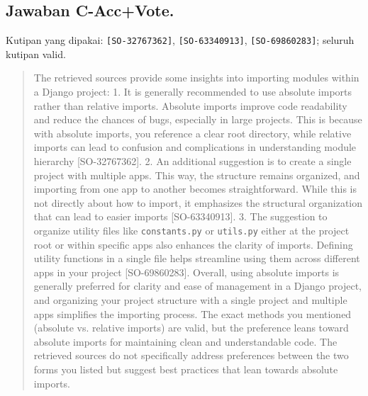 \subsection{Jawaban C-Acc+Vote.} Kutipan yang dipakai: \texttt{[SO-32767362]}, \texttt{[SO-63340913]}, \texttt{[SO-69860283]}; seluruh kutipan valid.
\begin{quote}\small The retrieved sources provide some insights into importing modules within a Django project:  1. It is generally recommended to use absolute imports rather than relative imports. Absolute imports improve code readability and reduce the chances of bugs, especially in large projects. This is because with absolute imports, you reference a clear root directory, while relative imports can lead to confusion and complications in understanding module hierarchy [SO-32767362].  2. An additional suggestion is to create a single project with multiple apps. This way, the structure remains organized, and importing from one app to another becomes straightforward. While this is not directly about how to import, it emphasizes the structural organization that can lead to easier imports [SO-63340913].  3. The suggestion to organize utility files like \texttt{constants.\allowbreak{}py} or \texttt{utils.\allowbreak{}py} either at the project root or within specific apps also enhances the clarity of imports. Defining utility functions in a single file helps streamline using them across different apps in your project [SO-69860283].  Overall, using absolute imports is generally preferred for clarity and ease of management in a Django project, and organizing your project structure with a single project and multiple apps simplifies the importing process. The exact methods you mentioned (absolute vs. relative imports) are valid, but the preference leans toward absolute imports for maintaining clean and understandable code.   The retrieved sources do not specifically address preferences between the two forms you listed but suggest best practices that lean towards absolute imports.\end{quote}

